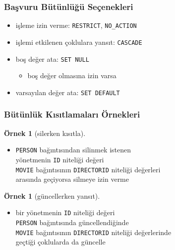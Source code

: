 \documentclass[dvipsnames]{beamer}
\theoremstyle{definition}
\theoremstyle{example}
\newtheorem{ornek}[theorem]{Örnek}
\theoremstyle{plain}
\begin{document}
\begin{frame}
  \frametitle{Başvuru Bütünlüğü Seçenekleri}

  \begin{itemize}
    \item işleme izin verme: \texttt{RESTRICT}, \texttt{NO\_ACTION}

    \pause
    \item işlemi etkilenen çoklulara yansıt: \texttt{CASCADE}

    \pause
    \item boş değer ata: \texttt{SET NULL}
    \begin{itemize}
      \item boş değer olmasına izin varsa
    \end{itemize}

    \pause
    \item varsayılan değer ata: \texttt{SET DEFAULT}
  \end{itemize}
\end{frame}

\begin{frame}[fragile]
  \frametitle{Bütünlük Kısıtlamaları Örnekleri}

  \begin{ornek}[silerken kısıtla]
    \begin{itemize}
      \item \texttt{PERSON} bağıntısından silinmek istenen\\
        yönetmenin \texttt{ID} niteliği değeri\\
        \texttt{MOVIE} bağıntısının \texttt{DIRECTORID} niteliği değerleri\\
        arasında geçiyorsa silmeye izin verme
    \end{itemize}
  \end{ornek}

  \pause
  \begin{ornek}[güncellerken yansıt]
    \begin{itemize}
      \item bir yönetmenin \texttt{ID} niteliği değeri\\
        \texttt{PERSON} bağıntısında güncellendiğinde\\
        \texttt{MOVIE} bağıntısının \texttt{DIRECTORID} niteliği değerlerinde\\
        geçtiği çoklularda da güncelle
    \end{itemize}
  \end{ornek}
\end{frame}
\end{document}
